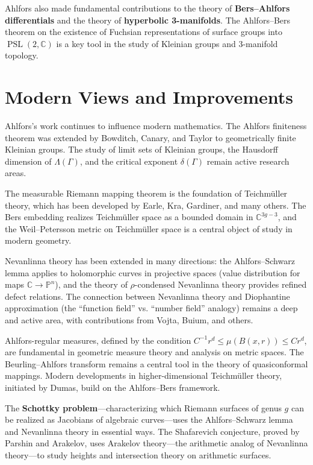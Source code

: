 Ahlfors also made fundamental contributions to the theory of \textbf{Bers--Ahlfors differentials} and the theory of \textbf{hyperbolic 3-manifolds}. The Ahlfors--Bers theorem on the existence of Fuchsian representations of surface groups into $\operatorname{PSL}(2,\mathbb{C})$ is a key tool in the study of Kleinian groups and 3-manifold topology.

\section{Modern Views and Improvements}

Ahlfors's work continues to influence modern mathematics. The Ahlfors finiteness theorem was extended by Bowditch, Canary, and Taylor to geometrically finite Kleinian groups. The study of limit sets of Kleinian groups, the Hausdorff dimension of $\Lambda(\Gamma)$, and the critical exponent $\delta(\Gamma)$ remain active research areas.

The measurable Riemann mapping theorem is the foundation of Teichm\"{u}ller theory, which has been developed by Earle, Kra, Gardiner, and many others. The Bers embedding realizes Teichm\"{u}ller space as a bounded domain in $\mathbb{C}^{3g-3}$, and the Weil--Petersson metric on Teichm\"{u}ller space is a central object of study in modern geometry.

Nevanlinna theory has been extended in many directions: the Ahlfors--Schwarz lemma applies to holomorphic curves in projective spaces (value distribution for maps $\mathbb{C} \to \mathbb{P}^n$), and the theory of $\rho$-condensed Nevanlinna theory provides refined defect relations. The connection between Nevanlinna theory and Diophantine approximation (the ``function field'' vs. ``number field'' analogy) remains a deep and active area, with contributions from Vojta, Buium, and others.

Ahlfors-regular measures, defined by the condition $C^{-1} r^d \leq \mu(B(x,r)) \leq C r^d$, are fundamental in geometric measure theory and analysis on metric spaces. The Beurling--Ahlfors transform remains a central tool in the theory of quasiconformal mappings. Modern developments in higher-dimensional Teichm\"{u}ller theory, initiated by Dumas, build on the Ahlfors--Bers framework.

The \textbf{Schottky problem}---characterizing which Riemann surfaces of genus $g$ can be realized as Jacobians of algebraic curves---uses the Ahlfors--Schwarz lemma and Nevanlinna theory in essential ways. The Shafarevich conjecture, proved by Parshin and Arakelov, uses Arakelov theory---the arithmetic analog of Nevanlinna theory---to study heights and intersection theory on arithmetic surfaces.

